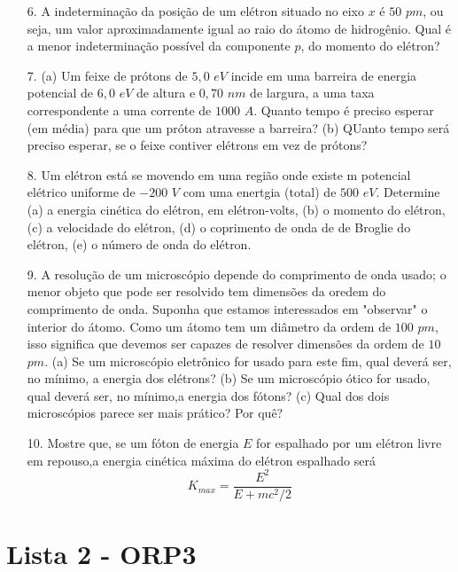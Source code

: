 \begin{itemize}
    \item[6.] \textbf{\cite{halliday}} A indeterminação da posição de um elétron situado no eixo $x$ é $50$ $pm$, ou seja, um valor aproximadamente igual ao raio do átomo de hidrogênio. Qual é a menor indeterminação possível da componente $p$, do momento do elétron?

    \item[7.] \textbf{\cite{halliday}} (a) Um feixe de prótons de $5,0$ $eV$ incide em uma barreira de energia potencial de $6,0$ $eV$ de altura e $0,70$ $nm$ de largura, a uma taxa correspondente a uma corrente de $1000$ $A$. Quanto tempo é preciso esperar (em média) para que um próton atravesse a barreira? (b) QUanto tempo será preciso esperar, se o feixe contiver elétrons em vez de prótons?

    \item[8.] \textbf{\cite{halliday}} Um elétron está se movendo em uma região onde existe m potencial elétrico uniforme de $-200$ $V$ com uma enertgia (total) de $500$ $eV$. Determine (a) a energia cinética do elétron, em elétron-volts, (b) o momento do elétron, (c) a velocidade do elétron, (d) o coprimento de onda de de Broglie do elétron, (e) o número de onda do elétron.

    \item[9.] \textbf{\cite{halliday}} A resolução de um microscópio depende do comprimento de onda usado; o menor objeto que pode ser resolvido tem dimensões da oredem do comprimento de onda. Suponha que estamos interessados em "observar" o interior do átomo. Como um átomo tem um diâmetro da ordem de $100$ $pm$, isso significa que devemos ser capazes de resolver dimensões da ordem de $10$ $pm$. (a) Se um microscópio eletrônico for usado para este fim, qual deverá ser, no mínimo, a energia dos elétrons? (b) Se um microscópio ótico for usado, qual deverá ser, no mínimo,a energia dos fótons? (c) Qual dos dois microscópios parece ser mais prático? Por quê?

    \item[10.] \textbf{\cite{halliday}} Mostre que, se um fóton de energia $E$ for espalhado por um elétron livre em repouso,a energia cinética máxima do elétron espalhado será
    \begin{equation*}
        K_{max}= \frac{E^2}{E + mc^2/2}
    \end{equation*}
    
\end{itemize}
\newpage
\section{Lista 2 - ORP3} \label{ch:orp3l2}

